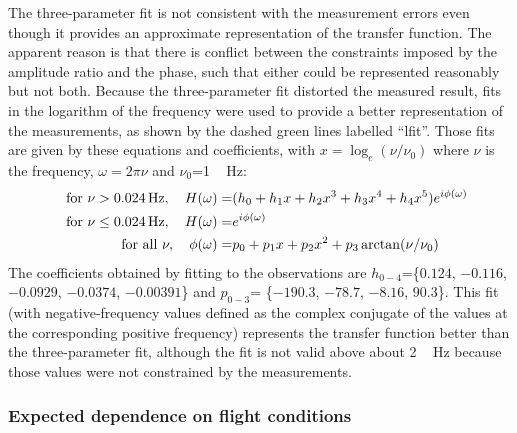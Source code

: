 \documentclass[amt, manuscript]{copernicus}
\begin{document}
The three-parameter fit is not consistent with the measurement errors
even though it provides an approximate representation of the transfer
function. The apparent reason is that there is conflict between the
constraints imposed by the amplitude ratio and the phase, such that
either could be represented reasonably but not both. Because the
three-parameter fit distorted the measured result, fits in the logarithm
of the frequency were used to provide a better representation of the
measurements, as shown by the dashed green lines labelled ``lfit''.
Those fits are given by these equations and coefficients, with
\(x=\log_{e}(\nu/\nu_{0})\) where \(\nu\) is the frequency,
\(\omega=2\pi\nu\) and \(\nu_{0}\)=\unit{1\,Hz}: \begin{align}
\hskip1em\mathrm{for}\ \nu>0.024\,\mathrm{Hz},\quad H(\omega)= & (h_{0}+h_{1}x+h_{2}x^{3}+h_{3}x^{4}+h_{4}x^{5})e^{i\phi(\omega)}{\label{eq:lfitH}} \\
\hskip1em\mathrm{for}\ \nu\leq0.024\,\mathrm{Hz},\quad H(\omega)= & e^{i\phi(\omega)} \\
\hskip1em\mathrm{for}\ \mathrm{all}\ \nu,\quad\phi(\omega)= & p_{0}+p_{1}x+p_{2}x^{2}+p_{3}\arctan(\nu/\nu_{0})
\end{align} The coefficients obtained by fitting to the observations are
\(h_{0-4}\)=\{\(0.124\), \(-0.116\), \(-0.0929\), \(-0.0374\),
\(-0.00391\)\} and \(p_{0-3}\)= \{\(-190.3\), \(-78.7\), \(-8.16\),
\(90.3\)\}. This fit (with negative-frequency values defined as the
complex conjugate of the values at the corresponding positive frequency)
represents the transfer function better than the three-parameter fit,
although the fit is not valid above about \unit{2\,Hz} because those
values were not constrained by the measurements.

\subsubsection{\texorpdfstring{Expected dependence on flight
conditions\label{subsec:Expected-dependence-on}}{Expected dependence on flight conditions}}
\end{document}
